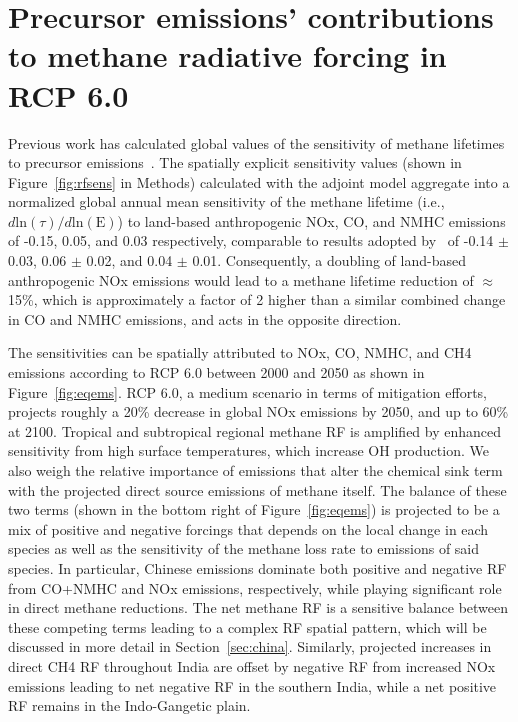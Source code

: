 \section{Precursor emissions' contributions to methane radiative forcing in RCP 6.0}

Previous work has calculated global values of the sensitivity of methane lifetimes to precursor emissions~\citep{ref:fry2012,ref:holmes2013}. The spatially explicit sensitivity values (shown in Figure~\ref{fig:rfsens} in Methods) calculated with the adjoint model aggregate into a normalized global annual mean sensitivity of the methane lifetime (i.e., $d \mathrm{ln}(\tau)/d\mathrm{ln}(\mathrm{E})$) to land-based anthropogenic NOx, CO, and NMHC emissions of -0.15, 0.05, and 0.03 respectively, comparable to results adopted by~\citet{ref:holmes2013} of -0.14 $\pm$ 0.03, 0.06 $\pm$ 0.02, and 0.04 $\pm$ 0.01. Consequently, a doubling of land-based anthropogenic NOx emissions would lead to a methane lifetime reduction of $\approx$ 15\%, which is approximately a factor of 2 higher than a similar combined change in CO and NMHC emissions, and acts in the opposite direction.  


The sensitivities can be spatially attributed to NOx, CO, NMHC, and CH4 emissions according to RCP 6.0 between 2000 and 2050 as shown in Figure~\ref{fig:eqems}. RCP 6.0, a medium scenario in terms of mitigation efforts, projects roughly a 20\% decrease in global NOx emissions by 2050, and up to 60\% at 2100. Tropical and subtropical regional methane RF is amplified by enhanced sensitivity from high surface temperatures, which increase OH production. We also weigh the relative importance of emissions that alter the chemical sink term with the projected direct source emissions of methane itself. The balance of these two terms (shown in the bottom right of Figure~\ref{fig:eqems}) is projected to be a mix of positive and negative forcings that depends on the local change in each species as well as the sensitivity of the methane loss rate to emissions of said species. In particular, Chinese emissions dominate both positive and negative RF from CO+NMHC and NOx emissions, respectively, while playing significant role in direct methane reductions.  The net methane RF is a sensitive balance between these competing terms leading to a complex RF spatial pattern, which will be discussed in more detail in Section~\ref{sec:china}.  Similarly, projected increases in direct CH4 RF throughout India are offset by negative RF from increased NOx emissions leading to net negative RF in the southern India, while a net positive RF remains in the Indo-Gangetic plain.  

